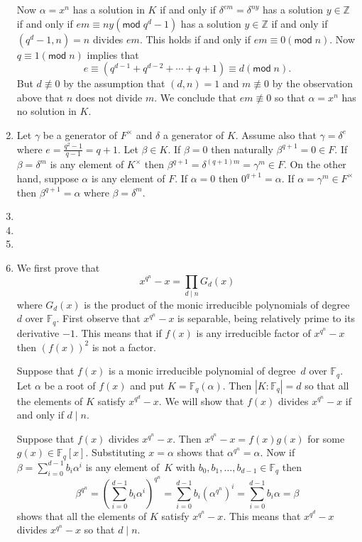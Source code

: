 \documentclass[12pt]{article}
\renewcommand{\pmod}[1]{\left(\mathsf{mod}\;#1\right)}
\begin{document}
\begin{enumerate}
Now $\alpha=x^n$ has a solution in $K$ if and only if
$\delta^{em}=\delta^{ny}$ has a solution $y\in\mathbb{Z}$
if and only if $em\equiv ny\pmod{q^d-1}$
has a solution $y\in\mathbb{Z}$
if and only if $\left(q^d-1,n\right)=n$ divides $em$.
This holds if and only if $em\equiv 0\pmod{n}$.
Now $q\equiv 1\pmod{n}$ implies that
\[e\equiv\left(q^{d-1}+q^{d-2}+\cdots+q+1\right)\equiv d\pmod{n}.\]
But $d\not\equiv 0$ by the assumption
that $\left(d,n\right)=1$ and $m\not\equiv 0$ by the observation
above that $n$ does not divide $m$.
We conclude that $em\not\equiv 0$ so that $\alpha=x^n$
has no solution in $K$.

\item %
Let $\gamma$ be a generator of $F^\times$
and $\delta$ a generator of $K$.
Assume also that $\gamma=\delta^e$
where $e=\frac{q^2-1}{q-1}=q+1$.
Let $\beta\in K$.
If $\beta=0$ then naturally $\beta^{q+1}=0\in F$.
If $\beta=\delta^m$ is any element of $K^\times$
then $\beta^{q+1}=\delta^{\left(q+1\right)m}=\gamma^m\in F$.
On the other hand, suppose $\alpha$ is any element of $F$.
If $\alpha=0$ then $0^{q+1}=\alpha$.
If $\alpha=\gamma^m\in F^\times$
then $\beta^{q+1}=\alpha$ where $\beta=\delta^m$.

\item %
\item %
\item %
\item %
We first prove that
\begin{equation}\label{Theorem2}
x^{q^n}-x=\prod_{d\mid n}G_d\left(x\right)
\end{equation}
where $G_d\left(x\right)$ is the product
of the monic irreducible polynomials of degree~$d$ over $\mathbb{F}_q$.
First observe that $x^{q^n}-x$ is separable, being
relatively prime to its derivative $-1$. This means that if
$f\left(x\right)$ is any irreducible factor of $x^{q^n}-x$
then $\left(f\left(x\right)\right)^2$ is not a factor.

Suppose that $f\left(x\right)$ is a monic irreducible polynomial
of degree~$d$ over $\mathbb{F}_q$.
Let $\alpha$ be a root of $f\left(x\right)$ and put
$K=\mathbb{F}_q\left(\alpha\right)$. Then $\left|K:\mathbb{F}_q\right|=d$
so that all the elements of $K$ satisfy $x^{q^d}-x$.
We will show that $f\left(x\right)$ divides $x^{q^n}-x$
if and only if $d\mid n$.

Suppose that $f\left(x\right)$ divides $x^{q^n}-x$.
Then $x^{q^n}-x=f\left(x\right)g\left(x\right)$
for some $g\left(x\right)\in\mathbb{F}_q\left[x\right]$.
Substituting $x=\alpha$ shows that $\alpha^{q^n}=\alpha$.
Now if $\beta=\sum_{i=0}^{d-1}b_i\alpha^i$ is any element
of~$K$ with $b_0,b_1,\ldots,b_{d-1}\in\mathbb{F}_q$ then
\[\beta^{q^n}=\left(\sum_{i=0}^{d-1}b_i\alpha^i\right)^{q^n}
=\sum_{i=0}^{d-1}b_i\left(\alpha^{q^n}\right)^i
=\sum_{i=0}^{d-1}b_i\alpha=\beta\]
shows that all the elements of $K$ satisfy $x^{q^n}-x$.
This means that $x^{q^d}-x$ divides $x^{q^n}-x$ so that $d\mid n$.


\end{enumerate}
\end{document}
